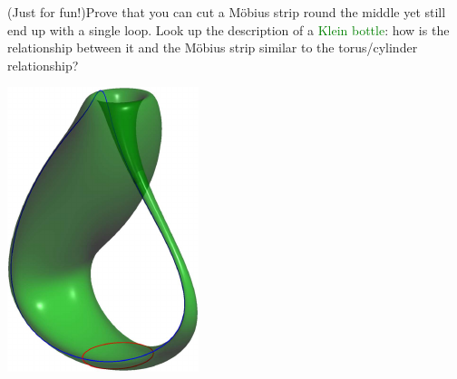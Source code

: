 \begin{exercises}{}{}
\begin{enumerate}
		\begin{minipage}[t]{0.79\linewidth}\vspace{0pt}
			\item (Just for fun!)\lstsp Prove that you can cut a Möbius strip round the middle yet still end up with a single loop.\smallbreak
			Look up the description of a \textcolor{Green}{Klein bottle}: how is the relationship between it and the Möbius strip similar to the torus/cylinder relationship?
		\end{minipage}
		\hfill
		\begin{minipage}[t]{0.2\linewidth}\vspace{0pt}
			\hfill \href{http://www.math.uci.edu/~ndonalds/math13/relations-klein.html}{\includegraphics[scale=0.6]{relations-klein}}
		\end{minipage}
	\end{enumerate}

\end{exercises}

\clearpage


